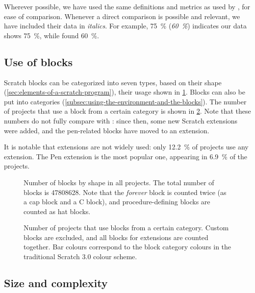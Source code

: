 \documentclass[../main]{subfiles}
\begin{document}
Wherever possible, we have used the same definitions and metrics as used by \textcite{aivaloglouHowKidsCode2016}, for ease of comparison.
Whenever a direct comparison is possible and relevant, we have included their data in \textit{italics}.
For example, \qty{75}{\percent} (\textit{\qty{60}{\percent}}) indicates our data shows \qty{75}{\percent}, while \citeauthor{aivaloglouHowKidsCode2016} found \qty{60}{\percent}.

\subsection{Use of blocks}\label{subsec:use-of-blocks}

Scratch blocks can be categorized into seven types, based on their shape (\cref{sec:elements-of-a-scratch-program}), their usage shown in \cref{fig:block-shapes}.
Blocks can also be put into categories (\cref{subsec:using-the-environment-and-the-blocks}).
The number of projects that use a block from a certain category is shown in \cref{fig:block-categories}.
Note that these numbers do not fully compare with \textcite{aivaloglouHowKidsCode2016}: since then, some new Scratch extensions were added, and the pen-related blocks have moved to an extension.

It is notable that extensions are not widely used: only \qty{12.2}{\percent} of projects use any extension.
The Pen extension is the most popular one, appearing in \qty{6.9}{\percent} of the projects.

\begin{figure}
    \centering
    
    \caption{
        Number of blocks by shape in all projects.
        The total number of blocks is \num{47808628}.
        Note that the \textit{forever} block is counted twice (as a cap block and a C block), and procedure-defining blocks are counted as hat blocks.
    }
    \label{fig:block-shapes}
\end{figure}

\begin{figure}
    \centering
    
    \caption{
        Number of projects that use blocks from a certain category.
        Custom blocks are excluded, and all blocks for extensions are counted together.
        Bar colours correspond to the block category colours in the traditional Scratch 3.0 colour scheme.
    }
    \label{fig:block-categories}
\end{figure}

\subsection{Size and complexity}\label{subsec:size-and-complexity}
\end{document}
